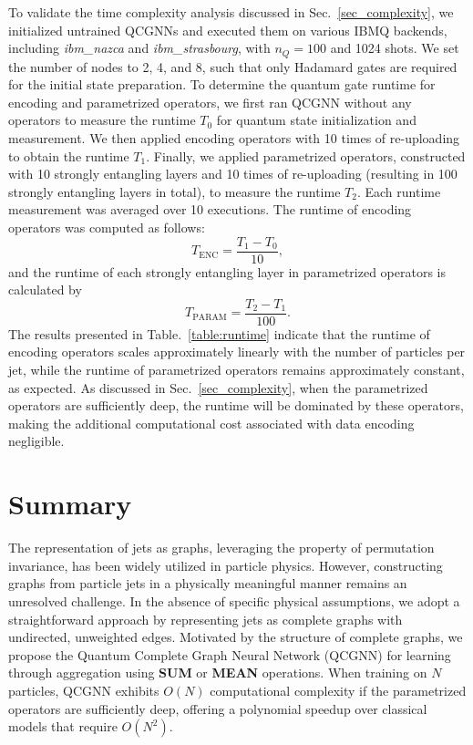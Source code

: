 \documentclass[reprint,amsmath,amssymb,prd,nofootinbib]{revtex4-2}
\begin{document}
To validate the time complexity analysis discussed in Sec.~\ref{sec_complexity}, we initialized untrained QCGNNs and executed them on various IBMQ backends, including \textit{ibm\_nazca} and \textit{ibm\_strasbourg}, with $n_Q=100$ and 1024 shots. We set the number of nodes to 2, 4, and 8, such that only Hadamard gates are required for the initial state preparation. To determine the quantum gate runtime for encoding and parametrized operators, we first ran QCGNN without any operators to measure the runtime $T_{0}$ for quantum state initialization and measurement. We then applied encoding operators with 10 times of re-uploading to obtain the runtime $T_{1}$. Finally, we applied parametrized operators, constructed with 10 strongly entangling layers and 10 times of re-uploading (resulting in 100 strongly entangling layers in total), to measure the runtime $T_{2}$. Each runtime measurement was averaged over 10 executions. The runtime of encoding operators was computed as follows:
\begin{equation*}
    T_{\text{ENC}} = \frac{T_{1}-T_{0}}{10},
\end{equation*}
and the runtime of each strongly entangling layer in parametrized operators is calculated by
\begin{equation*}
    T_{\text{PARAM}} = \frac{T_{2}-T_{1}}{100}.
\end{equation*}
The results presented in Table.~\ref{table:runtime} indicate that the runtime of encoding operators scales approximately linearly with the number of particles per jet, while the runtime of parametrized operators remains approximately constant, as expected. As discussed in Sec.~\ref{sec_complexity}, when the parametrized operators are sufficiently deep, the runtime will be dominated by these operators, making the additional computational cost associated with data encoding negligible.

\section{Summary} \label{sec_summary}

The representation of jets as graphs, leveraging the property of permutation invariance, has been widely utilized in particle physics. However, constructing graphs from particle jets in a physically meaningful manner remains an unresolved challenge. In the absence of specific physical assumptions, we adopt a straightforward approach by representing jets as complete graphs with undirected, unweighted edges. Motivated by the structure of complete graphs, we propose the Quantum Complete Graph Neural Network (QCGNN) for learning through aggregation using \textbf{SUM} or \textbf{MEAN} operations. When training on $N$ particles, QCGNN exhibits $O(N)$ computational complexity if the parametrized operators are sufficiently deep, offering a polynomial speedup over classical models that require $O(N^2)$.
\end{document}
